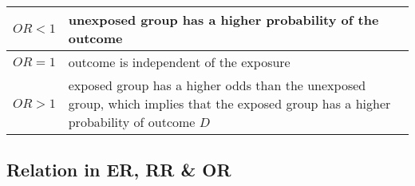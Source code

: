 \begin{customArrayStretch}{1.2}
    \begin{table}[H]
        \centering
        \begin{tabular}{|c|p{14cm}|}
            \hline

            $OR < 1$ & unexposed group has a higher probability of the outcome
            \cite{statistics/book/Statistics-for-Data-Scientists/Maurits-Kaptein} \\
            \hline

            $OR = 1$ & outcome is independent of the exposure
            \cite{statistics/book/Statistics-for-Data-Scientists/Maurits-Kaptein} \\
            \hline

            $OR > 1$ & exposed group has a higher odds than the unexposed group, which implies that the exposed group has a higher probability of outcome $D$
            \cite{statistics/book/Statistics-for-Data-Scientists/Maurits-Kaptein} \\
            \hline
        \end{tabular}
    \end{table}
\end{customArrayStretch}



\subsection{Relation in ER, RR \& OR}

